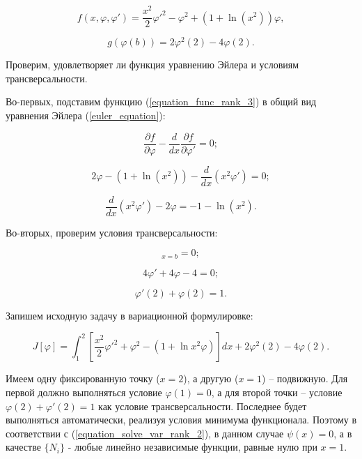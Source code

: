 \documentclass{article}
\begin{document}
\begin{equation}\label{equation_func_rank_3}
	f(x, \varphi, \varphi') = \frac{x^2}{2}\varphi'^2 - \varphi^2 + (1 + \ln(x^2))\varphi,
\end{equation}

\begin{displaymath}
	g(\varphi(b)) = 2\varphi^2(2) - 4\varphi(2).
\end{displaymath}

\noindent Проверим, удовлетворяет ли функция уравнению Эйлера и условиям трансверсальности.

Во-первых, подставим функцию (\ref{equation_func_rank_3}) в общий вид уравнения Эйлера (\ref{euler_equation}):

\begin{displaymath}
	\frac{\partial f}{\partial \varphi} - \frac{d}{dx} \frac{\partial f}{\partial \varphi'} = 0;
\end{displaymath}

\begin{displaymath}
	2\varphi - (1 + \ln(x^2)) - \frac{d}{dx}(x^2 \varphi') = 0;
\end{displaymath}

\begin{displaymath}
	\frac{d}{dx}(x^2 \varphi') - 2\varphi = -1 - \ln(x^2).
\end{displaymath}

Во-вторых, проверим условия трансверсальности:

\begin{displaymath}
	[\frac{\partial f}{\partial \varphi'} + \frac{\partial g}{\partial \varphi(b)}]_{x=b} = 0;
\end{displaymath}

\begin{displaymath}
	4\varphi' + 4\varphi - 4 = 0;
\end{displaymath}

\begin{displaymath}
	\varphi'(2) + \varphi(2) = 1.
\end{displaymath}

Запишем исходную задачу в вариационной формулировке:

\begin{displaymath}
	J[\varphi] = \int_{1}^{2} [\frac{x^2}{2}\varphi'^2 + \varphi^2 - (1 + \ln{x^2}\varphi)]dx + 2\varphi^2(2) - 4\varphi(2).
\end{displaymath}

Имеем одну фиксированную точку ($x = 2$), а другую ($x = 1$) – подвижную. Для первой должно выполняться условие $\varphi(1) = 0$, а для второй точки – условие $\varphi(2) + \varphi'(2) = 1$ как условие трансверсальности. Последнее будет выполняться автоматически, реализуя условия минимума функционала. Поэтому в соответствии с (\ref{equation_solve_var_rank_2}), в данном случае $\psi(x) = 0$, а в качестве $\lbrace N_{i} \rbrace$ - любые линейно независимые функции, равные нулю при $x = 1$.
\end{document}
